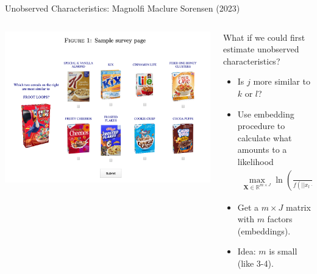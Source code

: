 \begin{frame}{Unobserved Characteristics: Magnolfi Maclure Sorensen (2023)}
\begin{columns}
\begin{column}{0.5\textwidth}
     \includegraphics[width=\textwidth]{resources/embeddings_1}      
\end{column}
\begin{column}{0.5\textwidth}
What if we could first estimate \alert{unobserved characteristics}?
\begin{itemize}
    \item Is $j$ more similar to $k$ or $l$?
    \item Use \alert{embedding} procedure to calculate what amounts to a likelihood
\begin{align*}
\max_{\mathbf{X} \in \mathbb{R}^{m \times J}} \ln \left(\frac{f(||x_l - x_j|| ,\alpha)}{f(||x_l - x_j|| ,\alpha)+{f(||x_k - x_j|| ,\alpha)}}\right)
\end{align*}
\item Get a $m \times J$ matrix with $m$ factors (embeddings).
\item Idea: $m$ is small (like 3-4).
\end{itemize}
\end{column}
\end{columns}
\end{frame}


